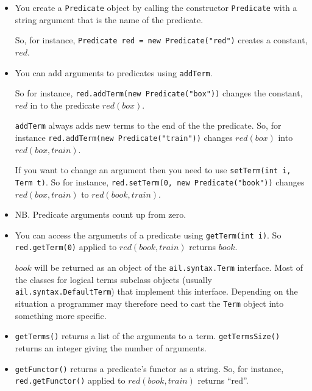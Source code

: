 \begin{itemize}
\item You create a \texttt{Predicate} object by calling the constructor \texttt{Predicate} with a string argument that is the name of the predicate.

So, for instance, \texttt{Predicate red = new Predicate("red")} creates a constant, $red$.  
\item You can add arguments to predicates using \texttt{addTerm}.

So for instance, \texttt{red.addTerm(new Predicate("box"))} changes the constant, $red$ in to the predicate $red(box)$.  

\texttt{addTerm} always adds new terms to the end of the the predicate.  So, for instance \texttt{red.addTerm(new Predicate("train"))} changes $red(box)$ into $red(box, train)$.  

If you want to change an argument then you need to use \texttt{setTerm(int i, Term t)}.  So for instance, \texttt{red.setTerm(0, new Predicate("book"))} changes $red(box, train)$ to $red(book, train)$.
\item NB.  Predicate arguments count up from zero.
\item You can access the arguments of a predicate using \texttt{getTerm(int i)}.  So \texttt{red.getTerm(0)} applied to $red(book, train)$ returns $book$.

\begin{sloppypar}
$book$ will be returned as an object of the \texttt{ail.syntax.Term} interface.  Most of the classes for logical terms subclass objects (usually \texttt{ail.syntax.DefaultTerm}) that implement this interface.  Depending on the situation a programmer may therefore need to cast the \texttt{Term} object into something more specific.
\end{sloppypar}
\item \texttt{getTerms()} returns a list of the arguments to a term.  \texttt{getTermsSize()} returns an integer giving the number of arguments.
\item \texttt{getFunctor()} returns a predicate's functor as a string.  So, for instance, \texttt{red.getFunctor()} applied to $red(book, train)$ returns ``red''.
\end{itemize}

